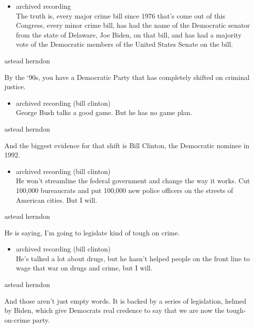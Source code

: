 \begin{itemize}
\tightlist
\item
  archived recording\\
  The truth is, every major crime bill since 1976 that's come out of
  this Congress, every minor crime bill, has had the name of the
  Democratic senator from the state of Delaware, Joe Biden, on that
  bill, and has had a majority vote of the Democratic members of the
  United States Senate on the bill.
\end{itemize}

astead herndon

By the `90s, you have a Democratic Party that has completely shifted on
criminal justice.

\begin{itemize}
\tightlist
\item
  archived recording (bill clinton)\\
  George Bush talks a good game. But he has no game plan.
\end{itemize}

astead herndon

And the biggest evidence for that shift is Bill Clinton, the Democratic
nominee in 1992.

\begin{itemize}
\tightlist
\item
  archived recording (bill clinton)\\
  He won't streamline the federal government and change the way it
  works. Cut 100,000 bureaucrats and put 100,000 new police officers on
  the streets of American cities. But I will.
\end{itemize}

astead herndon

He is saying, I'm going to legislate kind of tough on crime.

\begin{itemize}
\tightlist
\item
  archived recording (bill clinton)\\
  He's talked a lot about drugs, but he hasn't helped people on the
  front line to wage that war on drugs and crime, but I will.
\end{itemize}

astead herndon

And those aren't just empty words. It is backed by a series of
legislation, helmed by Biden, which give Democrats real credence to say
that we are now the tough-on-crime party.

